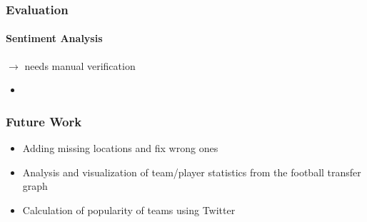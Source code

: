 \documentclass{beamer}
\begin{document}
	\begin{frame}
    \frametitle{Evaluation}
		\framesubtitle{Sentiment Analysis}
		$\rightarrow$ needs manual verification
		\begin{itemize}
		\item
		\end{itemize}
  \end{frame}
	
	
	\begin{frame}
    \frametitle{Future Work}
		\begin{itemize}
      \item Adding missing locations and fix wrong ones
			\item Analysis and visualization of team/player statistics from the football transfer graph
			\item Calculation of popularity of teams using Twitter
		\end{itemize}
  \end{frame}
	
	
	
\end{document}
